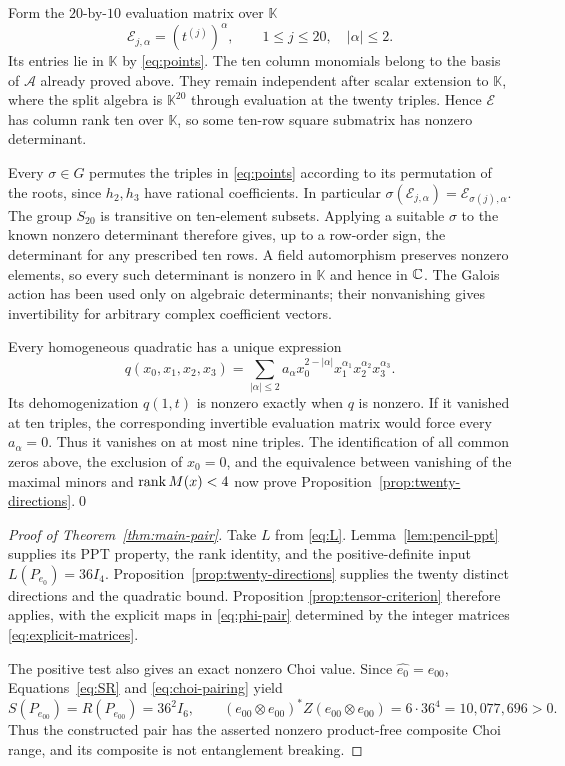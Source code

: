 Form the $20$-by-$10$ evaluation matrix over $\mathbb K$
\[
 \mathcal E_{j,\alpha}=(t^{(j)})^\alpha,\qquad
 1\leq j\leq20,\quad |\alpha|\leq2.
\]
Its entries lie in $\mathbb K$ by \eqref{eq:points}.  The ten column
monomials belong to the basis of $\mathcal A$ already proved above.
They remain independent after scalar extension to $\mathbb K$, where
the split algebra is $\mathbb K^{20}$ through evaluation at the
twenty triples.  Hence $\mathcal E$ has column rank ten over
$\mathbb K$, so some ten-row square submatrix has nonzero determinant.

Every $\sigma\in G$ permutes the triples in \eqref{eq:points} according
to its permutation of the roots, since $h_2,h_3$ have rational
coefficients.  In particular
$\sigma(\mathcal E_{j,\alpha})=\mathcal E_{\sigma(j),\alpha}$.
The group $S_{20}$ is transitive on ten-element subsets.  Applying a
suitable $\sigma$ to the known nonzero determinant therefore gives,
up to a row-order sign, the determinant for any prescribed ten rows.
A field automorphism preserves nonzero elements, so every such
determinant is nonzero in $\mathbb K$ and hence in $\mathbb C$.  The Galois
action has been used only on algebraic determinants; their nonvanishing
gives invertibility for arbitrary complex coefficient vectors.

Every homogeneous quadratic has a unique expression
\[
 q(x_0,x_1,x_2,x_3)=\sum_{|\alpha|\leq2}
 a_\alpha x_0^{2-|\alpha|}
 x_1^{\alpha_1}x_2^{\alpha_2}x_3^{\alpha_3}.
\]
Its dehomogenization $q(1,t)$ is nonzero exactly when $q$ is nonzero.
If it vanished at ten triples, the corresponding invertible evaluation
matrix would force every $a_\alpha=0$.  Thus it vanishes on at most
nine triples.  The identification of all common zeros above, the
exclusion of $x_0=0$, and the equivalence between vanishing of the
maximal minors and $\operatorname{rank} M(x)<4$ now prove
Proposition~\ref{prop:twenty-directions}.\qed

\begin{proof}[Proof of Theorem~\ref{thm:main-pair}]
Take $L$ from \eqref{eq:L}.  Lemma~\ref{lem:pencil-ppt} supplies its PPT
property, the rank identity, and the positive-definite input
$L(P_{e_0})=36I_4$.  Proposition~\ref{prop:twenty-directions} supplies
the twenty distinct directions and the quadratic bound.  Proposition
\ref{prop:tensor-criterion} therefore applies, with the explicit maps
in \eqref{eq:phi-pair} determined by the integer matrices
\eqref{eq:explicit-matrices}.

The positive test also gives an exact nonzero Choi value.  Since
$\widehat{e_0}=e_{00}$, Equations~\eqref{eq:SR} and
\eqref{eq:choi-pairing} yield
\[
 S(P_{e_{00}})=R(P_{e_{00}})=36^2I_6,\qquad
 (e_{00}\otimes e_{00})^*Z(e_{00}\otimes e_{00})
 =6\cdot36^4=10{,}077{,}696>0.
\]
Thus the constructed pair has the asserted nonzero product-free
composite Choi range, and its composite is not entanglement breaking.
\end{proof}
